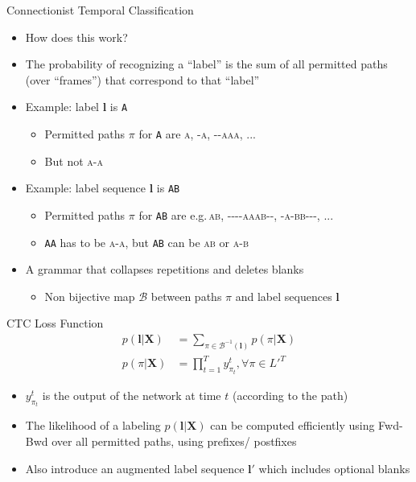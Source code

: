 \begin{frame}{Connectionist Temporal Classification}
  \begin{itemize}
  \item How does this work?
  \item The probability of recognizing a ``label'' is the sum of all permitted paths
    (over ``frames'') that correspond to that ``label''
  \item Example: label $\boldsymbol{l}$ is \texttt{A}
    \begin{itemize}
    \item Permitted paths $\pi$ for \texttt{A} are \textsc{a}, \textsc{-a}, \textsc{{-}-aaa}, ...
    \item But not \textsc{a-a}
    \end{itemize}
  \item Example: label sequence $\boldsymbol{l}$ is \texttt{AB}
    \begin{itemize}
    \item Permitted paths $\pi$ for \texttt{AB} are e.g.\,\textsc{ab}, \textsc{{-}-{-}-aaab-{-}}, \textsc{-a-bb-{-}-}, ...
    \item \texttt{AA} has to be \textsc{a-a}, but \texttt{AB} can be \textsc{ab} or \textsc{a-b}
    \end{itemize}
  \item A grammar that collapses repetitions and deletes blanks
    \begin{itemize}
    \item Non bijective map $\mathcal{B}$ between paths $\pi$ and label sequences $\boldsymbol{l}$
    \end{itemize}
  \end{itemize}
\end{frame}

\begin{frame}{CTC Loss Function}
  \begin{align}
    p(\boldsymbol{l}|\boldsymbol{X})   & = \sum_{\pi \in \mathcal{B}^{-1}(\boldsymbol{l})} p(\pi|\boldsymbol{X})\\
    p(\pi|\boldsymbol{X}) & = \prod_{t=1}^T y^t_{\pi_t}, \forall \pi \in L'^T
  \end{align}
  \begin{itemize}
  \item $y^t_{\pi_t}$ is the output of the network at time $t$ (according to the path)
  \item The likelihood of a labeling $p(\boldsymbol{l}|\boldsymbol{X})$ can be computed efficiently using Fwd-Bwd over all permitted paths, using prefixes/ postfixes
  \item Also introduce an augmented label sequence $\boldsymbol{l'}$ which includes optional blanks
  \end{itemize}
\end{frame}

